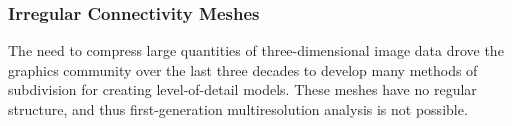 \documentclass[10.5pt]{article}
\begin{document}
\subsubsection*{Irregular Connectivity Meshes}
The need to compress large quantities of three-dimensional image data drove the graphics community over the last three decades to
develop many methods of subdivision for creating level-of-detail models. These meshes have no regular structure, and thus first-generation
multiresolution analysis is not possible.
 
\printbibliography
\end{document}
